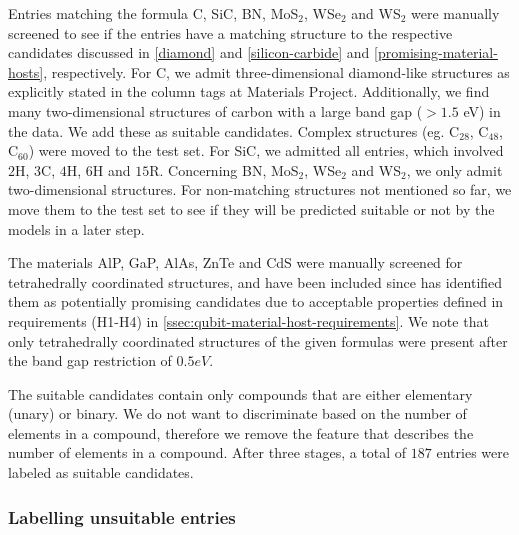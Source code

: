 Entries matching the formula C, SiC, BN, MoS$_2$, WSe$_2$ and WS$_2$ were manually screened to see if the entries have a matching structure to the respective candidates discussed in \autoref{diamond} and \ref{silicon-carbide} and \ref{promising-material-hosts}, respectively.
For C, we admit three-dimensional diamond-like structures as explicitly stated in the column tags at Materials Project. Additionally, we find many two-dimensional structures of carbon with a large band gap ($>1.5$ eV) in the data. We add these as suitable candidates. Complex structures (eg. C$_{28}$, C$_{48}$, C$_{60}$) were moved to the test set. For SiC, we admitted all entries, which involved $2$H, $3$C, $4$H, $6$H and $15$R. Concerning BN, MoS$_2$, WSe$_2$ and  WS$_2$, we only admit two-dimensional structures. For non-matching structures not mentioned so far, we move them to the test set to see if they will be predicted suitable or not by the models in a later step.



The materials AlP, GaP, AlAs, ZnTe and CdS were manually screened for tetrahedrally coordinated structures, and have been included since \citeauthor{Weber2010} \cite{Weber2010} has identified them as potentially promising candidates due to acceptable properties defined in requirements (H1-H4) in \autoref{ssec:qubit-material-host-requirements}. We note that only tetrahedrally coordinated structures of the given formulas were present after the band gap restriction of $0.5eV$.

The suitable candidates contain only compounds that are either elementary (unary) or binary. We do not want to discriminate based on the number of elements in a compound, therefore we remove the feature that describes the number of elements in a compound. After three stages, a total of $187$ entries were labeled as suitable candidates.

\subsubsection{Labelling unsuitable entries}

